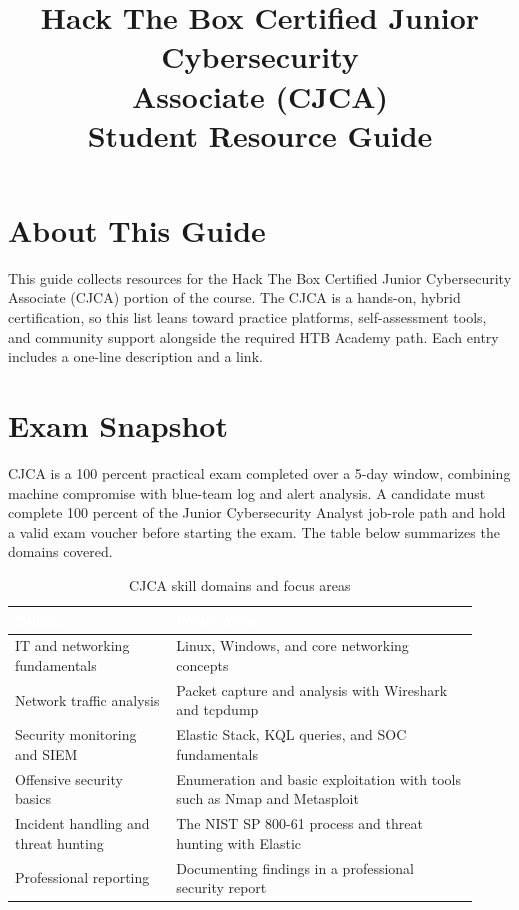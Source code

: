 \documentclass[11pt,letterpaper]{article}
\title{\color{navy}\textbf{Hack The Box Certified Junior Cybersecurity\\Associate (CJCA)\\Student Resource Guide}}
\date{}
\author{}
\begin{document}
\maketitle
\thispagestyle{fancy}

\section*{About This Guide}
This guide collects resources for the Hack The Box Certified Junior Cybersecurity Associate (CJCA) portion of the course. The CJCA is a hands-on, hybrid certification, so this list leans toward practice platforms, self-assessment tools, and community support alongside the required HTB Academy path. Each entry includes a one-line description and a link.

\section{Exam Snapshot}
CJCA is a 100 percent practical exam completed over a 5-day window, combining machine compromise with blue-team log and alert analysis. A candidate must complete 100 percent of the Junior Cybersecurity Analyst job-role path and hold a valid exam voucher before starting the exam. The table below summarizes the domains covered.

\begin{table}[htbp]
\centering
\caption{CJCA skill domains and focus areas}
\begin{tabular}{@{}p{0.32\linewidth}p{0.6\linewidth}@{}}
\toprule
\rowcolor{navy}
\textcolor{white}{\textbf{Domain}} & \textcolor{white}{\textbf{Focus Area}} \\
\midrule
IT and networking fundamentals & Linux, Windows, and core networking concepts \\
\rowcolor{lightrow} Network traffic analysis & Packet capture and analysis with Wireshark and tcpdump \\
Security monitoring and SIEM & Elastic Stack, KQL queries, and SOC fundamentals \\
\rowcolor{lightrow} Offensive security basics & Enumeration and basic exploitation with tools such as Nmap and Metasploit \\
Incident handling and threat hunting & The NIST SP 800-61 process and threat hunting with Elastic \\
\rowcolor{lightrow} Professional reporting & Documenting findings in a professional security report \\
\bottomrule
\end{tabular}
\end{table}
\end{document}
